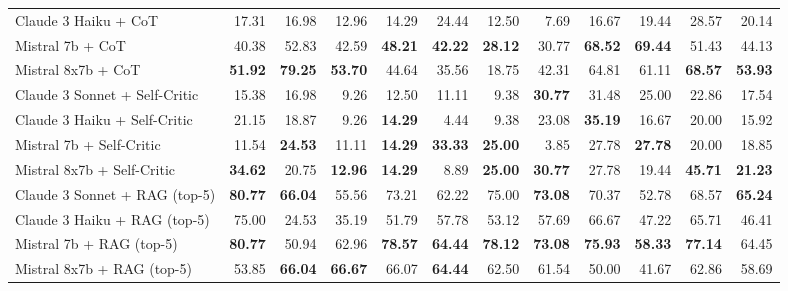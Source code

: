 \begin{table}[H]
{\begin{tabular}{lrrrrrrrrrrr}
Claude 3 Haiku + CoT & 17.31 & 16.98 & 12.96 & 14.29 & 24.44 & 12.50 & 7.69 & 16.67 & 19.44 & 28.57 & 20.14 \\
\rowcolor{Gray}
Mistral 7b + CoT & 40.38 & 52.83 & 42.59 & \textbf{48.21} & \textbf{42.22} & \textbf{28.12} & 30.77 & \textbf{68.52} & \textbf{69.44} & 51.43 & 44.13 \\
\rowcolor{Gray}
Mistral 8x7b + CoT & \textbf{51.92} & \textbf{79.25} & \textbf{53.70} & 44.64 & 35.56 & 18.75 & 42.31 & 64.81 & 61.11 & \textbf{68.57} & \textbf{53.93} \\
Claude 3 Sonnet + Self-Critic & 15.38 & 16.98 & 9.26 & 12.50 & 11.11 & 9.38 & \textbf{30.77} & 31.48 & 25.00 & 22.86 & 17.54 \\
Claude 3 Haiku + Self-Critic & 21.15 & 18.87 & 9.26 & \textbf{14.29} & 4.44 & 9.38 & 23.08 & \textbf{35.19} & 16.67 & 20.00 & 15.92 \\
Mistral 7b + Self-Critic & 11.54 & \textbf{24.53} & 11.11 & \textbf{14.29} & \textbf{33.33} & \textbf{25.00} & 3.85 & 27.78 & \textbf{27.78} & 20.00 & 18.85 \\
Mistral 8x7b + Self-Critic & \textbf{34.62} & 20.75 & \textbf{12.96} & \textbf{14.29} & 8.89 & \textbf{25.00} & \textbf{30.77} & 27.78 & 19.44 & \textbf{45.71} & \textbf{21.23} \\
\rowcolor{Gray}
Claude 3 Sonnet + RAG (top-5) & \textbf{80.77} & \textbf{66.04} & 55.56 & 73.21 & 62.22 & 75.00 & \textbf{73.08} & 70.37 & 52.78 & 68.57 & \textbf{65.24} \\
\rowcolor{Gray}
Claude 3 Haiku + RAG (top-5) & 75.00 & 24.53 & 35.19 & 51.79 & 57.78 & 53.12 & 57.69 & 66.67 & 47.22 & 65.71 & 46.41 \\
\rowcolor{Gray}
Mistral 7b + RAG (top-5) & \textbf{80.77} & 50.94 & 62.96 & \textbf{78.57} & \textbf{64.44} & \textbf{78.12} & \textbf{73.08} & \textbf{75.93} & \textbf{58.33} & \textbf{77.14} & 64.45 \\
\rowcolor{Gray}
Mistral 8x7b + RAG (top-5) & 53.85 & \textbf{66.04} & \textbf{66.67} & 66.07 & \textbf{64.44} & 62.50 & 61.54 & 50.00 & 41.67 & 62.86 & 58.69 \\
\bottomrule
\end{tabular}
}
 \label{tab:implicit_persona_20topics_70}
\end{table}




